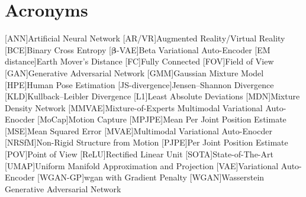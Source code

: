 \chapter*{Acronyms}

\begin{acronym}[TBD]
    [ANN]{Artificial Neural Network}
    [AR/VR]{Augmented Reality/Virtual Reality}
    [BCE]{Binary Cross Entropy}
    [$\boldsymbol{\beta}$-VAE]{Beta Variational Auto-Encoder}
    [EM distance]{Earth Mover's Distance}
    [FC]{Fully Connected}
    [FOV]{Field of View}
    [GAN]{Generative Adversarial Network}
    [GMM]{Gaussian Mixture Model}
    [HPE]{Human Pose Estimation}
    [JS-divergence]{Jensen–Shannon Divergence}
    [KLD]{Kullback–Leibler Divergence}
    [L1]{Least Absolute Deviations}
    [MDN]{Mixture Density Network}
    [MMVAE]{Mixture-of-Experts Multimodal Variational Auto-Enocder}
    [MoCap]{Motion Capture}
    [MPJPE]{Mean Per Joint Position Estimate}
    [MSE]{Mean Squared Error}
    [MVAE]{Multimodal Variational Auto-Enocder}
    [NRSfM]{Non-Rigid Structure from Motion}
    [PJPE]{Per Joint Position Estimate}
    [POV]{Point of View}
    [ReLU]{Rectified Linear Unit}
    [SOTA]{State-of-The-Art}
    [UMAP]{Uniform Manifold Approximation and Projection}
    [VAE]{Variational Auto-Encoder}
    [WGAN-GP]{\ac{wgan} with Gradient Penalty}
    [WGAN]{Wasserstein Generative Adversarial Network}
\end{acronym}

